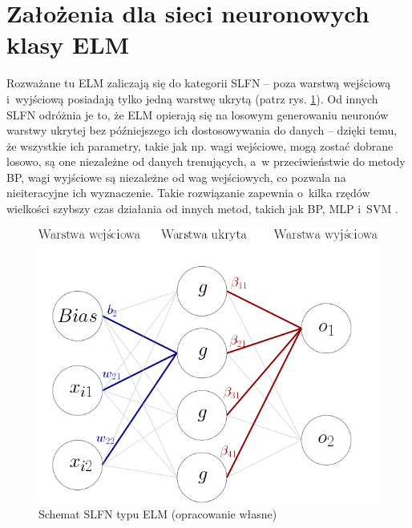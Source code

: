 \documentclass[pl]{minipw} %
\begin{document}
\section{Założenia dla sieci neuronowych klasy ELM}
Rozważane tu ELM zaliczają się do kategorii SLFN -- poza warstwą wejściową i~wyjściową posiadają tylko jedną warstwę ukrytą (patrz rys. \ref{schemat_elm}). Od innych SLFN odróżnia je to, że ELM opierają się na losowym generowaniu neuronów warstwy ukrytej bez późniejszego ich dostosowywania do danych -- dzięki temu, że wszystkie ich parametry, takie jak np. wagi wejściowe, mogą zostać dobrane losowo, są one niezależne od danych trenujących, a~w przeciwieństwie do metody BP, wagi wyjściowe są niezależne od wag wejściowych, co pozwala na nieiteracyjne ich wyznaczenie. Takie rozwiązanie zapewnia o~kilka rzędów wielkości szybszy czas działania od innych metod, takich jak BP, MLP i~SVM \cite{akusok-hpelm}.
\begin{figure}[H]
\includegraphics[width=\textwidth]{schemat_sieci.png}
\caption[Schemat SLFN typu ELM]{Schemat SLFN typu ELM (opracowanie własne)}
\label{schemat_elm}
\end{figure}
\end{document}
